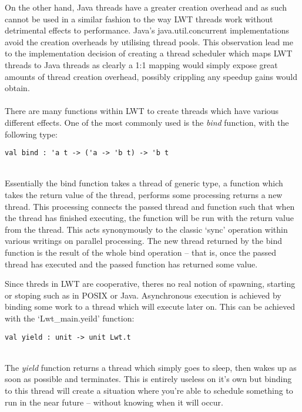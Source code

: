\documentclass[12pt,twoside,notitlepage]{report}
\begin{document}
On the other hand, Java threads have a greater creation overhead and as such cannot be used in a similar fashion to the way LWT threads work without detrimental effects to performance. Java's java.util.concurrent implementations avoid
the creation overheads by utilising thread pools\cite{web:threadpools}. This observation lead me to the implementation decision of creating a thread scheduler which maps LWT threads to Java threads as clearly a 1:1 mapping would
simply expose great amounts of thread creation overhead, possibly crippling any speedup gains would obtain.
\\
\\
%
%
There are many functions within LWT to create threads which have various different effects. One of the most commonly used is the {\em bind} function, with the following type:
\\
\begin{lstlisting}[frame=single]
val bind : 'a t -> ('a -> 'b t) -> 'b t
\end{lstlisting}
\hfill\\
Essentially the bind function takes a thread of generic type, a function which takes the return value of the thread, performs some processing returns a new thread. This processing connects the passed thread and function such that when
the thread has finished executing, the function will be run with the return value from the thread. This acts synonymously to the classic `sync' operation within various writings on parallel processing\cite{cormen2009}. The new thread
returned by the bind function is the result of the whole bind operation -- that is, once the passed thread has executed and the passed function has returned some value.

Since threds in LWT are cooperative, theres no real notion of spawning, starting or stoping such as in POSIX or Java. Asynchronous execution is achieved by binding some work to a thread which will execute later on. This can be
achieved with the `Lwt\_main.yeild' function:
\\
\begin{lstlisting}[frame=single]
val yield : unit -> unit Lwt.t
\end{lstlisting}
\hfill\\
The {\em yield} function returns a thread which simply goes to sleep, then wakes up as soon as possible and terminates. This is entirely useless on it's own but binding to this thread will create a situation where you're able to
schedule something to run in the near future -- without knowing when it will occur.
\\
\\
\end{document}
